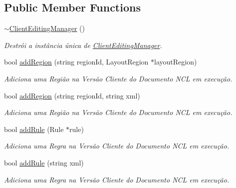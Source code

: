 \subsection*{Public Member Functions}
\begin{DoxyCompactItemize}
\item 
\hyperlink{classbr_1_1ufscar_1_1lince_1_1ginga_1_1wac_1_1editing_1_1ClientEditingManager_a963d65786d4e563fdb5e091c2aa3215b}{$\sim$ClientEditingManager} ()
\begin{DoxyCompactList}\small\item\em Destrói a instância única de \hyperlink{classbr_1_1ufscar_1_1lince_1_1ginga_1_1wac_1_1editing_1_1ClientEditingManager}{ClientEditingManager}. \item\end{DoxyCompactList}\item 
bool \hyperlink{classbr_1_1ufscar_1_1lince_1_1ginga_1_1wac_1_1editing_1_1ClientEditingManager_a554a556985da2aaa32fe3c705d957705}{addRegion} (string regionId, LayoutRegion $\ast$layoutRegion)
\begin{DoxyCompactList}\small\item\em Adiciona uma Região na Versão Cliente do Documento NCL em execução. \item\end{DoxyCompactList}\item 
bool \hyperlink{classbr_1_1ufscar_1_1lince_1_1ginga_1_1wac_1_1editing_1_1ClientEditingManager_a4f4a856d51b586312be91b376ec0d8f3}{addRegion} (string regionId, string xml)
\begin{DoxyCompactList}\small\item\em Adiciona uma Região na Versão Cliente do Documento NCL em execução. \item\end{DoxyCompactList}\item 
bool \hyperlink{classbr_1_1ufscar_1_1lince_1_1ginga_1_1wac_1_1editing_1_1ClientEditingManager_a21f7109da6d0eb0b54629547513ff69e}{addRule} (Rule $\ast$rule)
\begin{DoxyCompactList}\small\item\em Adiciona uma Regra na Versão Cliente do Documento NCL em execução. \item\end{DoxyCompactList}\item 
bool \hyperlink{classbr_1_1ufscar_1_1lince_1_1ginga_1_1wac_1_1editing_1_1ClientEditingManager_abbf0ba0c717c55996fac349a88f78b6f}{addRule} (string xml)
\begin{DoxyCompactList}\small\item\em Adiciona uma Regra na Versão Cliente do Documento NCL em execução. \item\end{DoxyCompactList}\item 

\end{DoxyCompactItemize}
